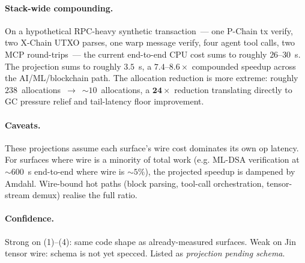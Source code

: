\paragraph{Stack-wide compounding.}
On a hypothetical RPC-heavy synthetic transaction~--- one P-Chain tx
verify, two X-Chain UTXO parses, one warp message verify, four agent
tool calls, two MCP round-trips~--- the current end-to-end CPU cost
sums to roughly $26$--$30$~\textmu s. The projection sums to roughly
$3.5$~\textmu s, a $\bm{7.4\text{--}8.6\times}$ compounded speedup
across the AI/ML/blockchain path. The allocation reduction is more
extreme: roughly $238$~allocations~$\to$~$\sim$$10$~allocations, a
$\bm{24\times}$ reduction translating directly to GC pressure
relief and tail-latency floor improvement.

\paragraph{Caveats.}
These projections assume each surface's wire cost dominates its own
op latency. For surfaces where wire is a minority of total work (e.g.
ML-DSA verification at $\sim$$600$~\textmu s end-to-end where wire is
$\sim$$5\%$), the projected speedup is dampened by Amdahl. Wire-bound
hot paths (block parsing, tool-call orchestration, tensor-stream
demux) realise the full ratio.

\paragraph{Confidence.}
Strong on (1)--(4): same code shape as already-measured surfaces.
Weak on Jin tensor wire: schema is not yet specced. Listed as
\emph{projection pending schema}.
